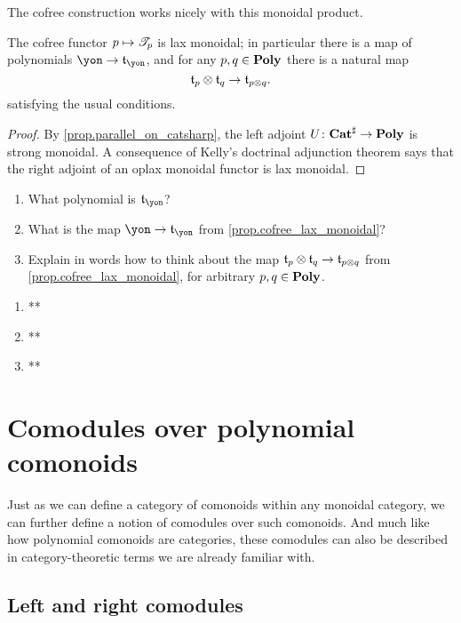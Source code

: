 \documentclass[Book-Poly]{subfiles}
\begin{document}
The cofree construction works nicely with this monoidal product.

\begin{proposition}\label{prop.cofree_lax_monoidal}
The cofree functor $p\mapsto\mathscr{T}_{p}$ is lax monoidal; in particular there is a map of polynomials $\yon\to\car{t}_\yon$, and for any $p,q\in\mathbf{Poly}$ there is a natural map
\[
	\mathfrak{t}_p\otimes\mathfrak{t}_q\to\mathfrak{t}_{p\otimes q}.
\]
satisfying the usual conditions.
\end{proposition}
\begin{proof}
By \cref{prop.parallel_on_catsharp}, the left adjoint $U\colon\mathbf{Cat}^\sharp\to\mathbf{Poly}$ is strong monoidal. A consequence of Kelly's doctrinal adjunction theorem \cite{kelly1974doctrinal} says that the right adjoint of an oplax monoidal functor is lax monoidal.
\end{proof}

\begin{exercise}
\begin{enumerate}
	\item What polynomial is $\car{t}_\yon$?
	\item What is the map $\yon\to\car{t}_\yon$ from \cref{prop.cofree_lax_monoidal}?
	\item Explain in words how to think about the map $\mathfrak{t}_p\otimes\mathfrak{t}_q\to\mathfrak{t}_{p\otimes q}$ from \cref{prop.cofree_lax_monoidal}, for arbitrary $p,q\in\mathbf{Poly}$.
\qedhere
\end{enumerate}
\begin{solution}
\begin{enumerate}
    \item **
    \item **
    \item **
\end{enumerate}
\end{solution}
\end{exercise}


\section{Comodules over polynomial comonoids}

Just as we can define a category of comonoids within any monoidal category, we can further define a notion of comodules over such comonoids.
And much like how polynomial comonoids are categories, these comodules can also be described in category-theoretic terms we are already familiar with.

\subsection{Left and right comodules}
\end{document}
